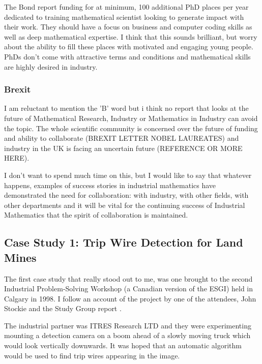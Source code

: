 \documentclass[11pt]{article} %
\begin{document}
The Bond report \cite{Bond} funding for at minimum, 100 additional PhD places per year dedicated to training mathematical scientist looking to generate impact with their work. They should have a focus on business and computer coding skills as well as deep mathematical expertise. I think that this sounds brilliant, but worry about the ability to fill these places with motivated and engaging young people. PhDs don't come with attractive terms and conditions and mathematical skills are highly desired in industry. 




	
	
	
	
	\subsubsection{Brexit}
	I am reluctant to mention the 'B' word but i think no report that looks at the future of Mathematical Research, Industry or Mathematics in Industry can avoid the topic. The whole scientific community is concerned over the future of funding and ability to collaborate (BREXIT LETTER NOBEL LAUREATES) and industry in the UK is facing an uncertain future (REFERENCE OR MORE HERE).
	
	I don't want to spend much time on this, but I would like to say that whatever happens, examples of success stories in industrial mathematics have demonstrated the need for collaboration: with industry, with other fields, with other departments and it will be vital for the continuing success of Industrial Mathematics that the spirit of collaboration is maintained. 
	
	\subsection{Case Study 1: Trip Wire Detection for Land Mines \label{landmines}}
	
	The first case study that really stood out to me, was one brought to the second Industrial Problem-Solving Workshop (a Canadian version of the ESGI) held in Calgary in 1998. I follow an account of the project by one of the attendees, John Stockie \cite{Stockie2015} and the Study Group report \cite{Jessop}.
	
The industrial partner was ITRES Research LTD and they were experimenting mounting a detection camera on a boom ahead of a slowly moving truck which would look vertically downwards. It was hoped that an automatic algorithm would be used to find trip wires appearing in the image. 
	
\end{document}

